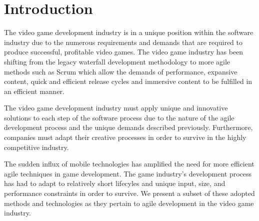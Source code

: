 \section{Introduction}
The video game development industry is in a unique position within the software industry due to the numerous requirements and demands that are required to produce successful, profitable video games. The video game industry has been shifting from the legacy waterfall development methodology to more agile methods such as Scrum which allow the demands of performance, expansive content, quick and efficient release cycles and immersive content to be fulfilled in an efficient manner.

The video game development industry must apply unique and innovative solutions to each step of the software process due to the nature of the agile development process and the unique demands described previously. Furthermore, companies must adapt their creative processes in order to survive in the highly competitive industry.

The sudden influx of mobile technologies has amplified the need for more efficient agile techniques in game development. The game industry's development process has had to adapt to relatively short lifecyles and unique input, size, and performance constraints in order to survive. We present a subset of these adopted methods and technologies as they pertain to agile development in the video game industry.
